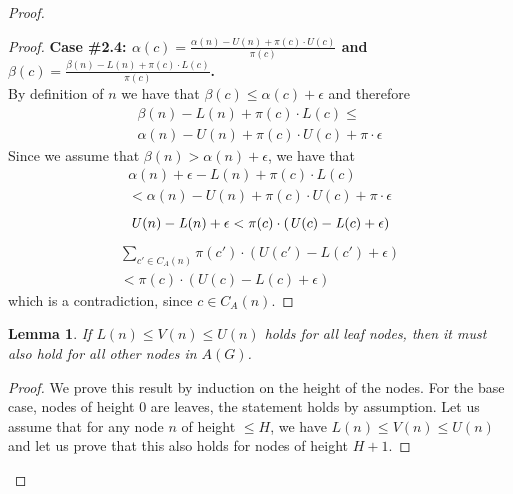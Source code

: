 \documentclass[letterpaper]{article} %
\newtheorem{lemma}{Lemma}
\newcommand{\MM}{\mathit{V}}
\newcommand{\pess}{\mathit{L}}
\newcommand{\opti}{\mathit{U}}
\begin{document}
\begin{proof}
\begin{proof}
{\bf Case \#2.4: $\alpha(c)=\frac{\alpha(n)-\opti(n)+\pi(c)\cdot\opti(c)}{\pi(c)}$ 
	and \\ $\beta(c)=\frac{\beta(n)-\pess(n)+\pi(c)\cdot\pess(c)}{\pi(c)}$.} \\
By definition of $n$ we have that $\beta(c)\leq \alpha(c)+\epsilon$ and therefore 
\begin{multline}
\beta(n)-\pess(n)+\pi(c)\cdot\pess(c) \leq \\
\alpha(n)-\opti(n)+\pi(c)\cdot\opti(c) + \pi\cdot\epsilon 
\end{multline}
Since we assume that $\beta(n)>\alpha(n)+\epsilon$, we have that
\begin{multline}
\alpha(n)+\epsilon-\pess(n)+\pi(c)\cdot\pess(c)  \\
< \alpha(n)-\opti(n)+\pi(c)\cdot\opti(c) + \pi\cdot\epsilon 
\end{multline}
\begin{equation} 
\opti(n)-\pess(n)+\epsilon <  \pi(c)\cdot(\opti(c)-\pess(c) + \epsilon) \\
\end{equation}
\begin{multline}
\sum_{c'\in C_A(n)} \pi(c')\cdot(\opti(c')-\pess(c') + \epsilon) \\ 
<\pi(c)\cdot(\opti(c)-\pess(c) + \epsilon)
\end{multline}
which is a contradiction, since $c\in C_A(n)$. 
\end{proof}


\begin{lemma}
If $\pess(n)\leq \MM(n)\leq \opti(n)$ holds for all leaf nodes, then it must also hold for all other nodes in $A(G)$. 
\label{lem:opti-pess}
\end{lemma}
\begin{proof}
We prove this result by induction on the height of the nodes.
For the base case, nodes of height 0 are leaves, the statement holds by assumption.
Let us assume that for any node $n$ of height $\leq H$, we have $\pess(n)\leq \MM(n)\leq \opti(n)$ and let us prove that this also holds for nodes of height $H+1$.


\end{proof}
\end{proof}
\end{document}
